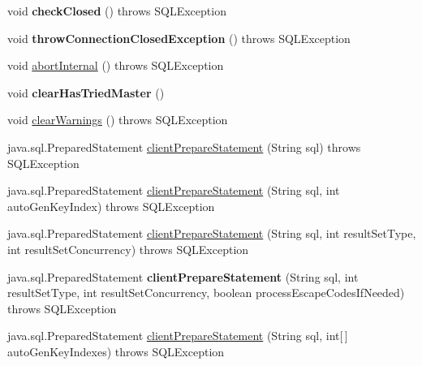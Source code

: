 \begin{DoxyCompactItemize}
void {\bfseries check\+Closed} ()  throws S\+Q\+L\+Exception 
\item 
\mbox{\label{classcom_1_1mysql_1_1jdbc_1_1_connection_impl_a536ee045d17c79957e340596354648db}} 
void {\bfseries throw\+Connection\+Closed\+Exception} ()  throws S\+Q\+L\+Exception 
\item 
void \mbox{\hyperlink{classcom_1_1mysql_1_1jdbc_1_1_connection_impl_a551f5ee36eb1b4f78304057f63636243}{abort\+Internal}} ()  throws S\+Q\+L\+Exception 
\item 
\mbox{\label{classcom_1_1mysql_1_1jdbc_1_1_connection_impl_a921d61420aeaf79fca8b5495ceccbfbf}} 
void {\bfseries clear\+Has\+Tried\+Master} ()
\item 
void \mbox{\hyperlink{classcom_1_1mysql_1_1jdbc_1_1_connection_impl_a1cd4a72947af16ecd5e7fd7d53a4e368}{clear\+Warnings}} ()  throws S\+Q\+L\+Exception 
\item 
java.\+sql.\+Prepared\+Statement \mbox{\hyperlink{classcom_1_1mysql_1_1jdbc_1_1_connection_impl_a10c73f6da363742abd84a76ea024292d}{client\+Prepare\+Statement}} (String sql)  throws S\+Q\+L\+Exception 
\item 
java.\+sql.\+Prepared\+Statement \mbox{\hyperlink{classcom_1_1mysql_1_1jdbc_1_1_connection_impl_a5ac2643cdeea74e7b46e0b7f18b980d4}{client\+Prepare\+Statement}} (String sql, int auto\+Gen\+Key\+Index)  throws S\+Q\+L\+Exception 
\item 
java.\+sql.\+Prepared\+Statement \mbox{\hyperlink{classcom_1_1mysql_1_1jdbc_1_1_connection_impl_a5e079f628e46e372708355bf45f8c7a3}{client\+Prepare\+Statement}} (String sql, int result\+Set\+Type, int result\+Set\+Concurrency)  throws S\+Q\+L\+Exception 
\item 
\mbox{\label{classcom_1_1mysql_1_1jdbc_1_1_connection_impl_a2a5452cdbac92b71a5a2d7b9e2c8106c}} 
java.\+sql.\+Prepared\+Statement {\bfseries client\+Prepare\+Statement} (String sql, int result\+Set\+Type, int result\+Set\+Concurrency, boolean process\+Escape\+Codes\+If\+Needed)  throws S\+Q\+L\+Exception 
\item 
java.\+sql.\+Prepared\+Statement \mbox{\hyperlink{classcom_1_1mysql_1_1jdbc_1_1_connection_impl_a7c16e87fcf61b55c5737bd2f041a847a}{client\+Prepare\+Statement}} (String sql, int\mbox{[}$\,$\mbox{]} auto\+Gen\+Key\+Indexes)  throws S\+Q\+L\+Exception 

\end{DoxyCompactItemize}
